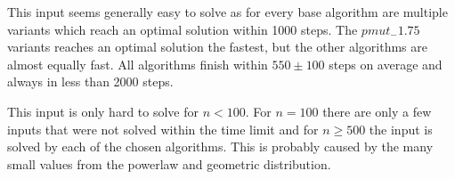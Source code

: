 This input seems generally easy to solve as for every base algorithm are multiple variants which reach an optimal solution within 1000 steps.
The $pmut_-1.75$ variants reaches an optimal solution the fastest, but the other algorithms are almost equally fast.
All algorithms finish within $550 \pm 100$ steps on average and always in less than 2000 steps.



This input is only hard to solve for $n<100$.
For $n = 100$ there are only a few inputs that were not solved within the time limit and for $n\ge500$ the input is solved by each of the chosen algorithms.
This is probably caused by the many small values from the powerlaw and geometric distribution.


% 

